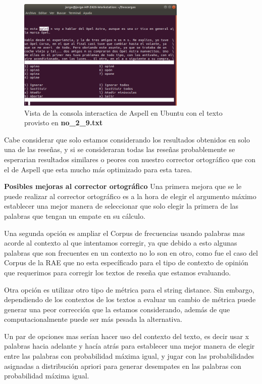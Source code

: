 \documentclass[paper=letter, fontsize=11pt]{scrartcl}
\numberwithin{equation}{section} %
\numberwithin{figure}{section} %
\numberwithin{table}{section} %
\begin{document}
\begin{figure}[h]
\centering
\includegraphics[width=8cm]{aspell.png}
\caption{Vista de la consola interactica de Aspell en Ubuntu con el texto provisto en \textbf{no\_2\_9.txt}}
\end{figure}

Cabe considerar que solo estamos considerando los resultados obtenidos en solo una de las rese\~nas, y si se consideraran todas las rese\~nas probablemente se esperarian resultados similares o peores con nuestro corrector ortogr\'afico que con el de Aspell que esta mucho m\'as optimizado para esta tarea.\newline

\textbf{Posibles mejoras al corrector ortogr\'afico}\newline
Una primera mejora que se le puede realizar al corrector ortogr\'afico es a la hora de elegir el argumento m\'aximo establecer una mejor manera de seleccionar que solo elegir la primera de las palabras que tengan un empate en su c\'alculo.\newline

Una segunda opci\'on es ampliar el Corpus de frecuencias usando palabras mas acorde al contexto al que intentamos corregir, ya que debido a esto algunas palabras que son frecuentes en un contexto no lo son en otro, como fue el caso del Corpus de la RAE que no esta espec\'ificado para el tipo de contexto de opini\'on que requerimos para corregir los textos de rese\~na que estamos evaluando.\newline

Otra opci\'on es utilizar otro tipo de m\'etrica para el string distance. Sin embargo, dependiendo de los contextos de los textos a evaluar un cambio de m\'etrica puede generar una peor correcci\'on que la estamos considerando, adem\'as de que computacionalmente puede ser m\'as pesada la alternativa.\newline

Un par de opciones mas ser\'ian hacer uso del contexto del texto, es decir usar x palabras hacia adelante y hac\'ia atr\'as para establecer una mejor manera de elegir entre las palabras con probabilidad m\'axima igual, y jugar con las probabilidades asignadas a distribuci\'on apriori para generar desempates en las palabras con probabilidad m\'axima igual.
\end{document}
